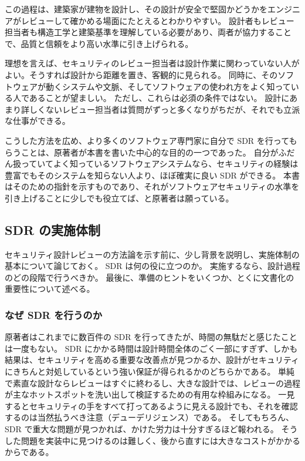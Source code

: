 \documentclass[uplatex]{jsarticle}
\begin{document}
この過程は、建築家が建物を設計し、その設計が安全で堅固かどうかをエンジニアがレビューして確かめる場面にたとえるとわかりやすい。
設計者もレビュー担当者も構造工学と建築基準を理解している必要があり、両者が協力することで、品質と信頼をより高い水準に引き上げられる。

理想を言えば、セキュリティのレビュー担当者は設計作業に関わっていない人がよい。そうすれば設計から距離を置き、客観的に見られる。
同時に、そのソフトウェアが動くシステムや文脈、そしてソフトウェアの使われ方をよく知っている人であることが望ましい。
ただし、これらは必須の条件ではない。
設計にあまり詳しくないレビュー担当者は質問がずっと多くなりがちだが、それでも立派な仕事ができる。

こうした方法を広め、より多くのソフトウェア専門家に自分で SDR を行ってもらうことは、原著者が本書を書いた中心的な目的の一つであった。
自分がふだん扱っていてよく知っているソフトウェアシステムなら、セキュリティの経験は豊富でもそのシステムを知らない人より、ほぼ確実に良い SDR ができる。
本書はそのための指針を示すものであり、それがソフトウェアセキュリティの水準を引き上げることに少しでも役立てば、と原著者は願っている。

\subsection{SDR の実施体制}

セキュリティ設計レビューの方法論を示す前に、少し背景を説明し、実施体制の基本について論じておく。
SDR は何の役に立つのか。
実施するなら、設計過程のどの段階で行うべきか。
最後に、準備のヒントをいくつか、とくに文書化の重要性について述べる。

\subsubsection{なぜ SDR を行うのか}

原著者はこれまでに数百件の SDR を行ってきたが、時間の無駄だと感じたことは一度もない。
SDR にかかる時間は設計時間全体のごく一部にすぎず、しかも結果は、セキュリティを高める重要な改善点が見つかるか、設計がセキュリティにきちんと対処しているという強い保証が得られるかのどちらかである。
単純で素直な設計ならレビューはすぐに終わるし、大きな設計では、レビューの過程が主なホットスポットを洗い出して検証するための有用な枠組みになる。
一見するとセキュリティの手をすべて打ってあるように見える設計でも、それを確認するのは当然払うべき注意（デューデリジェンス）である。
そしてもちろん、SDR で重大な問題が見つかれば、かけた労力は十分すぎるほど報われる。
そうした問題を実装中に見つけるのは難しく、後から直すには大きなコストがかかるからである。
\end{document}
